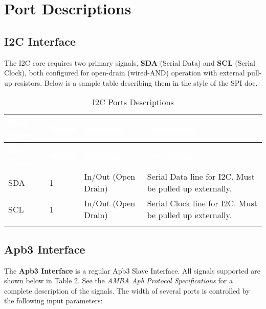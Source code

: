 \section{Port Descriptions}

\subsection{I2C Interface}

The I2C core requires two primary signals, \textbf{SDA} (Serial Data) and \textbf{SCL} (Serial Clock), both configured for open-drain (wired-AND) operation with external pull-up resistors. Below is a sample table describing them in the style of the SPI doc.

\renewcommand*{\arraystretch}{1.4}
\begingroup
\small
{} 

\begin{longtable}[H]{
  | p{}
  | p{}
  | p{}
  | p{} |
}
  \hline
  \rowcolor{black}
  \textcolor{white}{\textbf{Port Name}} &
  \textcolor{white}{\textbf{Width}} &
  \textcolor{white}{\textbf{Direction}} &
  \textcolor{white}{\textbf{Description}} \\ 
  \hline
  \endfirsthead

  \hline
  \rowcolor{black}
  \textcolor{white}{\textbf{Port Name}} &
  \textcolor{white}{\textbf{Width}} &
  \textcolor{white}{\textbf{Direction}} &
  \textcolor{white}{\textbf{Description}} \\
  \hline
  \endhead

  \hline
  \endfoot

SDA & 1 & In/Out (Open Drain) & Serial Data line for I2C. Must be pulled up externally. \\ \hline
SCL & 1 & In/Out (Open Drain) & Serial Clock line for I2C. Must be pulled up externally. \\ \hline

\caption{I2C Ports Descriptions}
\label{table:ports}
\end{longtable}
\endgroup

\subsection{Apb3 Interface}
The \textbf{Apb3 Interface} is a regular Apb3 Slave Interface. All signals supported are shown below in 
Table 2. See the \textit{AMBA Apb Protocol Specifications} for a complete description of the signals. The width of several ports is controlled 
by the following input parameters:

